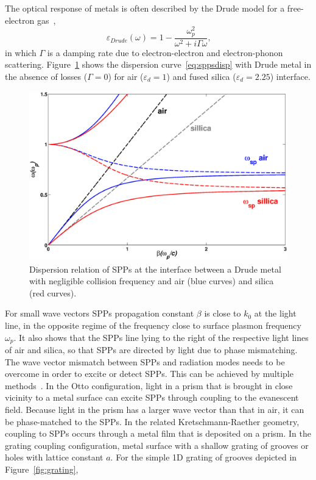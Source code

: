 The optical response of metals is often described by the Drude model for a free-electron gas~\cite{kittel1976introduction},
\begin{equation}
\varepsilon_{Drude}(\omega)=1-\frac{\omega_p^2}{\omega^2+i\Gamma\omega}\text{,}
\end{equation}
in which $\Gamma$ is a damping rate due to electron-electron and electron-phonon scattering.
Figure~\ref{fig:SPPdisp} shows the dispersion curve~\ref{eq:sppsdisp} with Drude metal  in the absence of losses ($\Gamma=0$) for air ($\varepsilon_d = 1$) and fused silica ($\varepsilon_d = 2.25$) interface.
\begin{figure}[htb]
\centering
\includegraphics[scale=0.4]{figures/SPPdisp.eps}
\caption{\label{fig:SPPdisp}Dispersion relation of SPPs at the interface between a Drude metal with negligible collision frequency and air (blue curves) and silica (red curves).}
\end{figure}
For small wave vectors SPPs propagation constant $\beta$ is close to $k_0$ at the light line, in the opposite regime of the frequency close to surface plasmon frequency $\omega_p$. It also shows that the SPPs line lying to the right of the respective light lines of air and silica, so that SPPs are directed by light due to phase mismatching. The wave vector mismatch between SPPs and radiation modes needs to be overcome in order to excite or detect SPPs. This can be achieved by multiple methods~\cite{raether1988surface}. In the Otto configuration, light in a prism that is brought in close vicinity to a metal surface can excite SPPs through coupling to the evanescent field. Because light in the prism has a larger wave vector than that in air, it can be phase-matched to the SPPs. In the related Kretschmann-Raether geometry, coupling to SPPs occurs through a metal film that is deposited on a prism. In the grating coupling configuration, metal surface with a shallow grating of grooves or holes with lattice constant $a$. For the simple 1D grating of grooves depicted in Figure~\ref{fig:grating},
